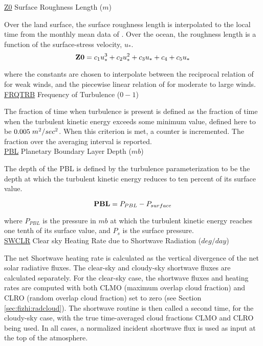 \noindent
{ \underline {Z0}  Surface Roughness Length ($m$) }

\noindent
Over the land surface, the surface roughness length is interpolated to the local
time from the monthly mean data of \cite{dorsell:89}. Over the ocean,
the roughness length is a function of the surface-stress velocity, $u_*$.
\[
{\bf Z0} = c_1u^3_* + c_2u^2_* + c_3u_* + c_4 + {c_5}{u_*}
\]

\noindent
where the constants are chosen to interpolate between the reciprocal relation of
\cite{kondo:75} for weak winds, and the piecewise linear relation of \cite{larpond:81}
for moderate to large winds.
\\
 
\noindent
{ \underline {FRQTRB}  Frequency of Turbulence ($0-1$) }

\noindent
The fraction of time when turbulence is present is defined as the fraction of
time when the turbulent kinetic energy exceeds some minimum value, defined here
to be $0.005 \hspace{.1cm}m^2/sec^2$. When this criterion is met, a counter is
incremented. The fraction over the averaging interval is reported.
\\
 
\noindent
{ \underline {PBL}  Planetary Boundary Layer Depth ($mb$) }

\noindent
The depth of the PBL is defined by the turbulence parameterization to be the
depth at which the turbulent kinetic energy reduces to ten percent of its surface
value.

\[
{\bf PBL} = P_{PBL} - P_{surface}
\]

\noindent
where $P_{PBL}$ is the pressure in $mb$ at which the turbulent kinetic energy
reaches one tenth of its surface value, and $P_s$ is the surface pressure.
\\
 
\noindent
{ \underline {SWCLR} Clear sky Heating Rate due to Shortwave Radiation ($deg/day$) }

\noindent
The net Shortwave heating rate is calculated as the vertical divergence of the
net solar radiative fluxes.
The clear-sky and cloudy-sky shortwave fluxes are calculated separately.
For the clear-sky case, the shortwave fluxes and heating rates are computed with
both CLMO (maximum overlap cloud fraction) and
CLRO (random overlap cloud fraction) set to zero (see Section \ref{sec:fizhi:radcloud}).
The shortwave routine is then called a second time, for the cloudy-sky case, with the
true time-averaged cloud fractions CLMO
and CLRO being used.  In all cases, a normalized incident shortwave flux is used as
input at the top of the atmosphere.

